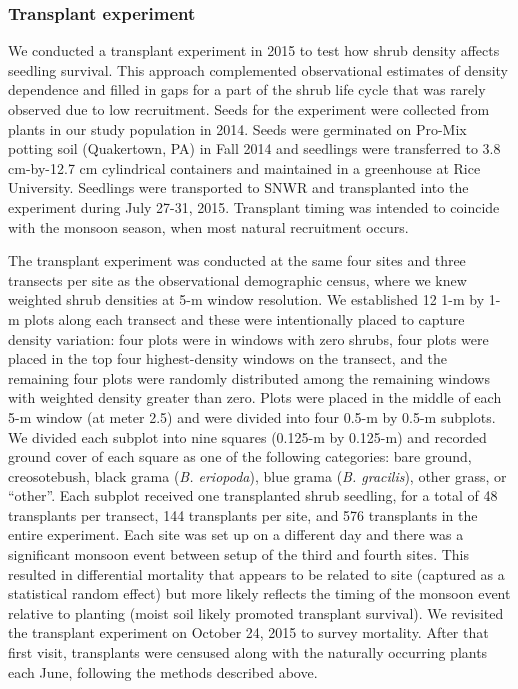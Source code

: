 \documentclass[11pt]{article}\usepackage[]{graphicx}\usepackage[usenames,dvipsnames]{xcolor}
\begin{document}
\subsubsection*{Transplant experiment}
We conducted a transplant experiment in 2015 to test how shrub density affects seedling survival. 
This approach complemented observational estimates of density dependence and filled in gaps for a part of the shrub life cycle that was rarely observed due to low recruitment. 
Seeds for the experiment were collected from plants in our study population in 2014.
Seeds were germinated on Pro-Mix potting soil (Quakertown, PA) in Fall 2014 and seedlings were transferred to 3.8 cm-by-12.7 cm cylindrical containers and maintained in a greenhouse at Rice University.
Seedlings were transported to SNWR and transplanted into the experiment during July 27-31, 2015.
Transplant timing was intended to coincide with the monsoon season, when most natural recruitment occurs. 

The transplant experiment was conducted at the same four sites and three transects per site as the observational demographic census, where we knew weighted shrub densities at 5-m window resolution. 
We established 12 1-m by 1-m plots along each transect and these were intentionally placed to capture density variation: four plots were in windows with zero shrubs, four plots were placed in the top four highest-density windows on the transect, and the remaining four plots were randomly distributed among the remaining windows with weighted density greater than zero. 
Plots were placed in the middle of each 5-m window (at meter 2.5) and were divided into four 0.5-m by 0.5-m subplots.
We divided each subplot into nine squares (0.125-m by 0.125-m) and recorded ground cover of each square as one of the following categories: bare ground, creosotebush, black grama (\textit{B. eriopoda}), blue grama (\textit{B. gracilis}), other grass, or ``other''.
Each subplot received one transplanted shrub seedling, for a total of 48 transplants per transect, 144 transplants per site, and 576 transplants in the entire experiment. 
Each site was set up on a different day and there was a significant monsoon event between setup of the third and fourth sites. 
This resulted in differential mortality that appears to be related to site (captured as a statistical random effect) but more likely reflects the timing of the monsoon event relative to planting (moist soil likely promoted transplant survival). 
We revisited the transplant experiment on October 24, 2015 to survey mortality. 
After that first visit, transplants were censused along with the naturally occurring plants each June, following the methods described above. 
\end{document}
